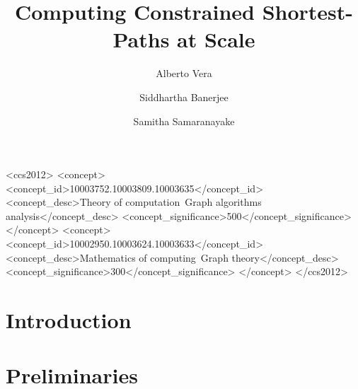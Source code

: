 \documentclass[screen,sigconf,anonymous,review]{acmart}
\begin{document}
\title{Computing Constrained Shortest-Paths at Scale}  
\author{Alberto Vera}
\author{Siddhartha Banerjee}
\author{Samitha Samaranayake}

\begin{abstract}

\end{abstract}



%
%
\begin{CCSXML}
<ccs2012>
<concept>
<concept_id>10003752.10003809.10003635</concept_id>
<concept_desc>Theory of computation~Graph algorithms analysis</concept_desc>
<concept_significance>500</concept_significance>
</concept>
<concept>
<concept_id>10002950.10003624.10003633</concept_id>
<concept_desc>Mathematics of computing~Graph theory</concept_desc>
<concept_significance>300</concept_significance>
</concept>
	</ccs2012>  
\end{CCSXML}




\maketitle

\section{Introduction}


\section{Preliminaries}
\label{sec:prelim}

\label{ssec:basic}

\end{document}
